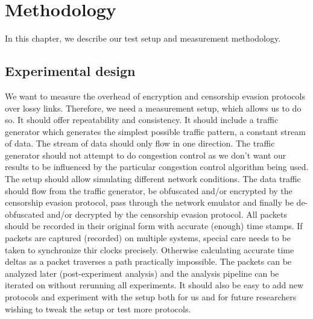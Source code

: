 
\chapter{Methodology}
\label{chap:methodology}

In this chapter, we describe our test setup and measurement methodology.

\section{Experimental design}
We want to measure the overhead of encryption and censorship evasion protocols over lossy links.
Therefore, we need a measurement setup, which allows us to do so.
It should offer repeatability and consistency.
It should include a traffic generator which generates the simplest possible traffic pattern, a constant stream of data.
The stream of data should only flow in one direction.
The traffic generator should not attempt to do congestion control as we don't want our results to be influenced by the particular congestion control algorithm being used.
The setup should allow simulating different network conditions.
The data traffic should flow from the traffic generator, be obfuscated and/or encrypted by the censorship evasion protocol, pass through the network emulator and finally be de-obfuscated and/or decrypted by the censorship evasion protocol.
All packets should be recorded in their original form with accurate (enough) time stamps.
If packets are captured (recorded) on multiple systems, special care needs to be taken to synchronize thir clocks precisely.
Otherwise calculating accurate time deltas as a packet traverses a path practically impossible.
The packets can be analyzed later (post-experiment analysis) and the analysis pipeline can be iterated on without rerunning all experiments.
It should also be easy to add new protocols and experiment with the setup both for us and for future researchers wishing to tweak the setup or test more protocols.

